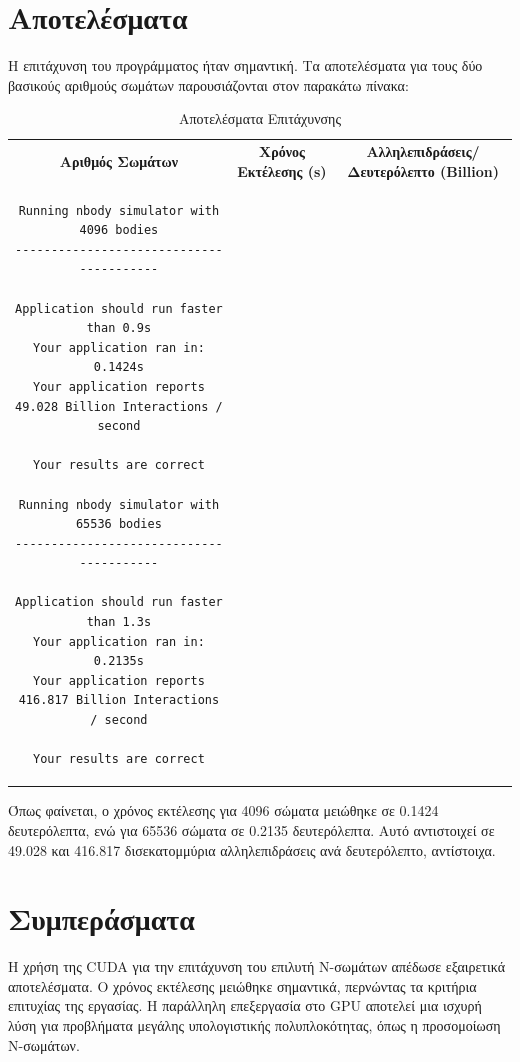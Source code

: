 \documentclass{article}
\begin{document}
\section{Αποτελέσματα}
Η επιτάχυνση του προγράμματος ήταν σημαντική. Τα αποτελέσματα για τους δύο βασικούς αριθμούς σωμάτων παρουσιάζονται στον παρακάτω πίνακα:

\begin{table}[h]
\centering
\begin{tabular}{|c|c|c|}
\hline
\textbf{Αριθμός Σωμάτων} & \textbf{Χρόνος Εκτέλεσης (s)} & \textbf{Αλληλεπιδράσεις/Δευτερόλεπτο (Billion)} \\
\begin{verbatim}
Running nbody simulator with 4096 bodies
----------------------------------------

Application should run faster than 0.9s
Your application ran in: 0.1424s
Your application reports  49.028 Billion Interactions / second

Your results are correct

Running nbody simulator with 65536 bodies
----------------------------------------

Application should run faster than 1.3s
Your application ran in: 0.2135s
Your application reports  416.817 Billion Interactions / second

Your results are correct
\end{verbatim}
\end{tabular}
\caption{Αποτελέσματα Επιτάχυνσης}
\end{table}

Όπως φαίνεται, ο χρόνος εκτέλεσης για 4096 σώματα μειώθηκε σε 0.1424 δευτερόλεπτα, ενώ για 65536 σώματα σε 0.2135 δευτερόλεπτα. Αυτό αντιστοιχεί σε 49.028 και 416.817 δισεκατομμύρια αλληλεπιδράσεις ανά δευτερόλεπτο, αντίστοιχα.

\section{Συμπεράσματα}
Η χρήση της CUDA για την επιτάχυνση του επιλυτή Ν-σωμάτων απέδωσε εξαιρετικά αποτελέσματα. Ο χρόνος εκτέλεσης μειώθηκε σημαντικά, περνώντας τα κριτήρια επιτυχίας της εργασίας. Η παράλληλη επεξεργασία στο GPU αποτελεί μια ισχυρή λύση για προβλήματα μεγάλης υπολογιστικής πολυπλοκότητας, όπως η προσομοίωση Ν-σωμάτων.
\end{document}
